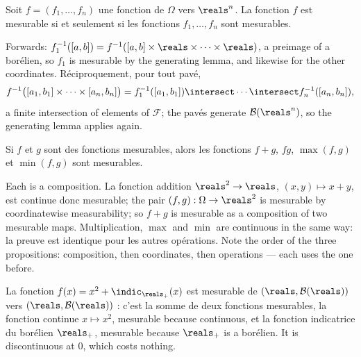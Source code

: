 \begin{prop}
  Soit $f = (f_{1},\ldots,f_{n})$ une fonction de $\Omega$ vers $\reals^{n}$. La
  fonction $f$ est mesurable si et seulement si les fonctions $f_{1},\ldots,f_{n}$
  sont mesurables.
\end{prop}

\begin{remark}
  Forwards: $f_{1}^{-1}([a,b]) = f^{-1}([a,b] \times \reals \times \cdots \times
  \reals)$, a preimage of a borélien, so $f_{1}$ is mesurable by the generating
  lemma, and likewise for the other coordinates. Réciproquement, pour tout pavé,
  \[
    f^{-1}\bigl([a_{1},b_{1}] \times \cdots \times [a_{n},b_{n}]\bigr)
    = f_{1}^{-1}([a_{1},b_{1}]) \intersect \cdots \intersect
      f_{n}^{-1}([a_{n},b_{n}]),
  \]
  a finite intersection of elements of $\mathcal{F}$; the pavés generate
  $\mathcal{B}(\reals^{n})$, so the generating lemma applies again.
\end{remark}

\begin{prop}
  Si $f$ et $g$ sont des fonctions mesurables, alors les fonctions $f + g$, $fg$,
  $\max(f,g)$ et $\min(f,g)$ sont mesurables.
\end{prop}

\begin{remark}
  Each is a composition. La fonction addition $\reals^{2} \to \reals$, $(x,y) \mapsto
  x + y$, est continue donc mesurable; the pair $(f,g) : \Omega \to \reals^{2}$ is
  mesurable by coordinatewise measurability; so $f + g$ is mesurable as a
  composition of two mesurable maps. Multiplication, $\max$ and $\min$ are
  continuous in the same way: la preuve est identique pour les autres opérations.
  Note the order of the three propositions: composition, then coordinates, then
  operations --- each uses the one before.
\end{remark}

\begin{example}
  La fonction $f(x) = x^{2} + \indic_{\reals_{+}}(x)$ est mesurable de
  $(\reals,\mathcal{B}(\reals))$ vers $(\reals,\mathcal{B}(\reals))$ : c'est la somme
  de deux fonctions mesurables, la fonction continue $x \mapsto x^{2}$, mesurable
  because continuous, et la fonction indicatrice du borélien $\reals_{+}$, mesurable
  because $\reals_{+}$ is a borélien. It is discontinuous at $0$, which costs nothing.
\end{example}

